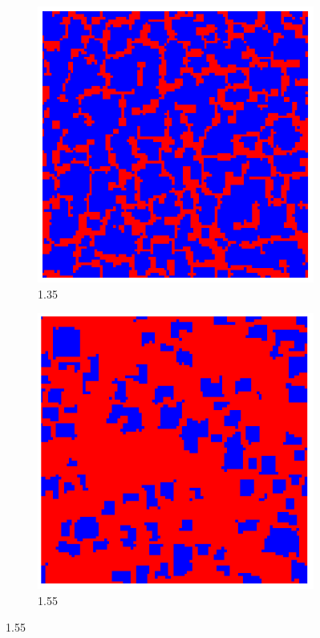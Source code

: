 \documentclass[a4paper]{article}
\begin{document}
	\begin{figure}
	\ContinuedFloat
	\begin{subfigure}{.5\textwidth}
		\includegraphics[width=.8\linewidth]{1.35-1.55-1.png}
		\caption{1.35}
	\end{subfigure}
	\begin{subfigure}{.5\textwidth}
		\includegraphics[width=.8\linewidth]{1.35-1.55-2.png}
		\caption{1.55}
	\end{subfigure}%
	

\end{figure}
\end{document}
